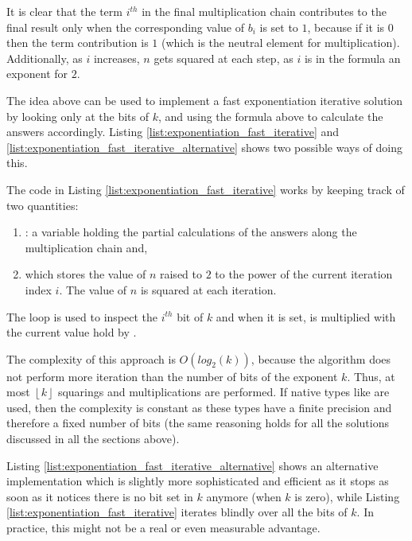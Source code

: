 It is clear that the term $i^{th}$ in the final multiplication chain contributes to the final result only when the corresponding value of $b_i$ is set to $1$, because if it is $0$ then the term contribution is $1$ (which is the neutral element for multiplication).
Additionally, as $i$ increases, $n$ gets squared at each step, as $i$ is in the formula an exponent for $2$. 


The idea above can be used to implement
a fast exponentiation iterative solution by looking only at the bits of $k$, and using the formula above to calculate the answers accordingly.
Listing \ref{list:exponentiation_fast_iterative} and \ref{list:exponentiation_fast_iterative_alternative} shows two  possible ways of doing this.




The code in Listing \ref{list:exponentiation_fast_iterative}  works by keeping track of two quantities:
\begin{enumerate}
    \item {}: a variable holding the partial calculations of the answers along the multiplication chain and, 
    \item {} which stores the value of $n$ raised to $2$ to the power of the current iteration index $i$. The value of $n$ is squared at each iteration.
\end{enumerate}
The loop is used to inspect the $i^{th}$ bit of $k$ and when it is set,  is multiplied with the current value hold by . 


The complexity of this approach is $O(log_2(k))$, because the algorithm does not perform more iteration than the number of bits of the exponent $k$.
Thus, at most $\left \lfloor{k}\right \rfloor$ squarings and multiplications are performed.
If native types like  are used, then the complexity is constant as these types have a finite precision and therefore a fixed number of bits (the same reasoning holds for all the solutions discussed in all the sections above). 

Listing \ref{list:exponentiation_fast_iterative_alternative} shows an alternative implementation which is slightly more sophisticated and efficient as it stops as soon as it notices there is no bit set in $k$ anymore (when $k$ is zero),  while Listing \ref{list:exponentiation_fast_iterative} iterates blindly over all the bits of $k$.
In practice, this might not be a real or even measurable advantage.

